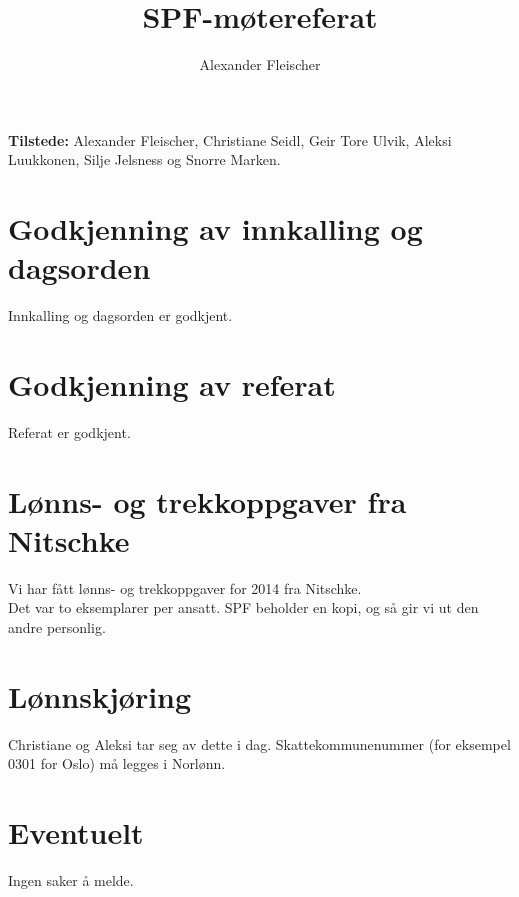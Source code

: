 \documentclass[12pt,norsk]{article}
\begin{document}
\title{SPF-møtereferat}
\author{Alexander Fleischer}
\maketitle


\textbf{Tilstede:} Alexander Fleischer, 
Christiane Seidl, Geir Tore Ulvik, Aleksi Luukkonen, 
Silje Jelsness og Snorre Marken.

\section{Godkjenning av innkalling og dagsorden}

Innkalling og dagsorden er godkjent.

\section{Godkjenning av referat}

Referat er godkjent.

\section{Lønns- og trekkoppgaver fra Nitschke}

Vi har fått lønns- og trekkoppgaver for 2014 fra Nitschke.\\

\noindent Det var to eksemplarer per ansatt. SPF
beholder en kopi, og så gir vi ut den andre personlig.

\section{Lønnskjøring}

Christiane og Aleksi tar seg av dette i dag. Skattekommunenummer
(for eksempel 0301 for Oslo) må legges i Norlønn.

\section{Eventuelt}
Ingen saker å melde.
\end{document}

